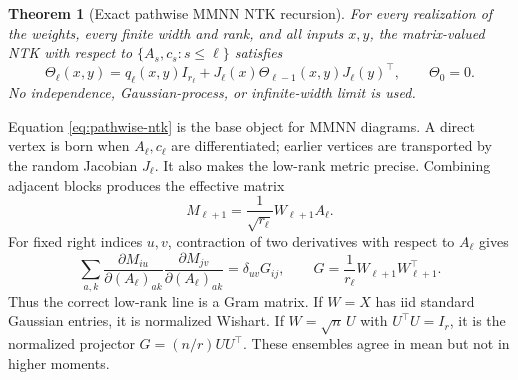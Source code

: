 \documentclass{article}
\newtheorem{theorem}{Theorem}[section]
\begin{document}
\begin{theorem}[Exact pathwise MMNN NTK recursion]
\label{thm:pathwise-mmnn}
For every realization of the weights, every finite width and rank, and all
inputs \(x,y\), the matrix-valued NTK with respect to
\(\{A_s,c_s:s\le\ell\}\) satisfies
\begin{equation}
\Theta_\ell(x,y)=q_\ell(x,y)I_{r_\ell}
+J_\ell(x)\Theta_{\ell-1}(x,y)J_\ell(y)^\top,
\qquad \Theta_0=0.
\label{eq:pathwise-ntk}
\end{equation}
No independence, Gaussian-process, or infinite-width limit is used.
\end{theorem}

Equation \eqref{eq:pathwise-ntk} is the base object for MMNN diagrams.  A
direct vertex is born when \(A_\ell,c_\ell\) are differentiated; earlier
vertices are transported by the random Jacobian \(J_\ell\).  It also makes
the low-rank metric precise.  Combining adjacent blocks produces the
effective matrix
\begin{equation}
M_{\ell+1}=\frac1{\sqrt{r_\ell}}W_{\ell+1}A_\ell.
\end{equation}
For fixed right indices \(u,v\), contraction of two derivatives with respect
to \(A_\ell\) gives
\begin{equation}
\sum_{a,k}
\frac{\partial M_{iu}}{\partial (A_\ell)_{ak}}
\frac{\partial M_{jv}}{\partial (A_\ell)_{ak}}
=\delta_{uv}G_{ij},
\qquad G=\frac1{r_\ell}W_{\ell+1}W_{\ell+1}^\top.
\label{eq:gram-tangent-metric}
\end{equation}
Thus the correct low-rank line is a Gram matrix.  If
\(W=X\) has iid standard Gaussian entries, it is normalized Wishart.  If
\(W=\sqrt n\,U\) with \(U^\top U=I_r\), it is the normalized projector
\(G=(n/r)UU^\top\).  These ensembles agree in mean but not in higher moments.
\end{document}
